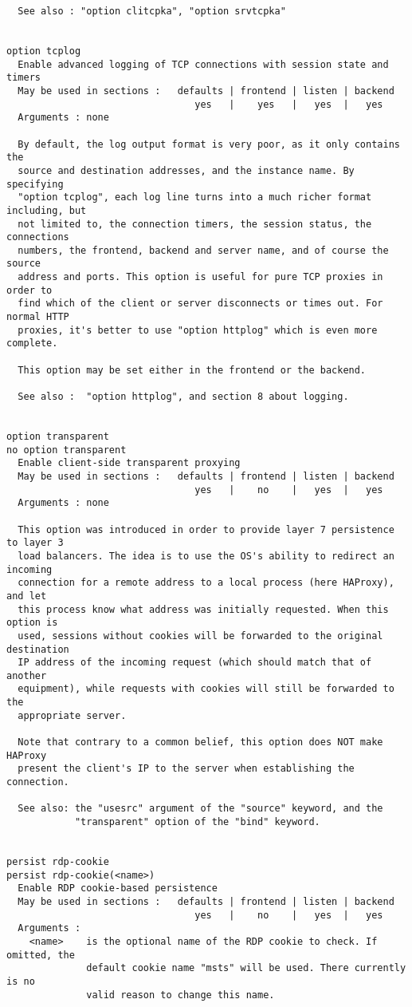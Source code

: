 \begin{verbatim}
  See also : "option clitcpka", "option srvtcpka"


option tcplog
  Enable advanced logging of TCP connections with session state and timers
  May be used in sections :   defaults | frontend | listen | backend
                                 yes   |    yes   |   yes  |   yes
  Arguments : none

  By default, the log output format is very poor, as it only contains the
  source and destination addresses, and the instance name. By specifying
  "option tcplog", each log line turns into a much richer format including, but
  not limited to, the connection timers, the session status, the connections
  numbers, the frontend, backend and server name, and of course the source
  address and ports. This option is useful for pure TCP proxies in order to
  find which of the client or server disconnects or times out. For normal HTTP
  proxies, it's better to use "option httplog" which is even more complete.

  This option may be set either in the frontend or the backend.

  See also :  "option httplog", and section 8 about logging.


option transparent
no option transparent
  Enable client-side transparent proxying
  May be used in sections :   defaults | frontend | listen | backend
                                 yes   |    no    |   yes  |   yes
  Arguments : none

  This option was introduced in order to provide layer 7 persistence to layer 3
  load balancers. The idea is to use the OS's ability to redirect an incoming
  connection for a remote address to a local process (here HAProxy), and let
  this process know what address was initially requested. When this option is
  used, sessions without cookies will be forwarded to the original destination
  IP address of the incoming request (which should match that of another
  equipment), while requests with cookies will still be forwarded to the
  appropriate server.

  Note that contrary to a common belief, this option does NOT make HAProxy
  present the client's IP to the server when establishing the connection.

  See also: the "usesrc" argument of the "source" keyword, and the
            "transparent" option of the "bind" keyword.


persist rdp-cookie
persist rdp-cookie(<name>)
  Enable RDP cookie-based persistence
  May be used in sections :   defaults | frontend | listen | backend
                                 yes   |    no    |   yes  |   yes
  Arguments :
    <name>    is the optional name of the RDP cookie to check. If omitted, the
              default cookie name "msts" will be used. There currently is no
              valid reason to change this name.


\end{verbatim}
